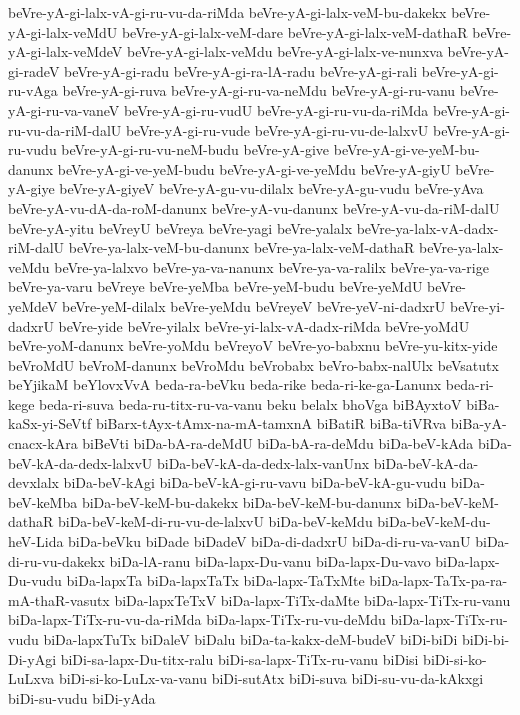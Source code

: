 {beVre-yA-gi-lalx-vA-gi-ru-vu-da-riMda
beVre-yA-gi-lalx-veM-bu-dakekx
beVre-yA-gi-lalx-veMdU
beVre-yA-gi-lalx-veM-dare
beVre-yA-gi-lalx-veM-dathaR
beVre-yA-gi-lalx-veMdeV
beVre-yA-gi-lalx-veMdu
beVre-yA-gi-lalx-ve-nunxva
beVre-yA-gi-radeV
beVre-yA-gi-radu
beVre-yA-gi-ra-lA-radu
beVre-yA-gi-rali
beVre-yA-gi-ru-vAga
beVre-yA-gi-ruva
beVre-yA-gi-ru-va-neMdu
beVre-yA-gi-ru-vanu
beVre-yA-gi-ru-va-vaneV
beVre-yA-gi-ru-vudU
beVre-yA-gi-ru-vu-da-riMda
beVre-yA-gi-ru-vu-da-riM-dalU
beVre-yA-gi-ru-vude
beVre-yA-gi-ru-vu-de-lalxvU
beVre-yA-gi-ru-vudu
beVre-yA-gi-ru-vu-neM-budu
beVre-yA-give
beVre-yA-gi-ve-yeM-bu-danunx
beVre-yA-gi-ve-yeM-budu
beVre-yA-gi-ve-yeMdu
beVre-yA-giyU
beVre-yA-giye
beVre-yA-giyeV
beVre-yA-gu-vu-dilalx
beVre-yA-gu-vudu
beVre-yAva
beVre-yA-vu-dA-da-roM-danunx
beVre-yA-vu-danunx
beVre-yA-vu-da-riM-dalU
beVre-yA-yitu
beVreyU
beVreya
beVre-yagi
beVre-yalalx
beVre-ya-lalx-vA-dadx-riM-dalU
beVre-ya-lalx-veM-bu-danunx
beVre-ya-lalx-veM-dathaR
beVre-ya-lalx-veMdu
beVre-ya-lalxvo
beVre-ya-va-nanunx
beVre-ya-va-ralilx
beVre-ya-va-rige
beVre-ya-varu
beVreye
beVre-yeMba
beVre-yeM-budu
beVre-yeMdU
beVre-yeMdeV
beVre-yeM-dilalx
beVre-yeMdu
beVreyeV
beVre-yeV-ni-dadxrU
beVre-yi-dadxrU
beVre-yide
beVre-yilalx
beVre-yi-lalx-vA-dadx-riMda
beVre-yoMdU
beVre-yoM-danunx
beVre-yoMdu
beVreyoV
beVre-yo-babxnu
beVre-yu-kitx-yide
beVroMdU
beVroM-danunx
beVroMdu
beVrobabx
beVro-babx-nalUlx
beVsatutx
beYjikaM
beYlovxVvA
beda-ra-beVku
beda-rike
beda-ri-ke-ga-Lanunx
beda-ri-kege
beda-ri-suva
beda-ru-titx-ru-va-vanu
beku
belalx
bhoVga
biBAyxtoV
biBa-kaSx-yi-SeVtf
biBarx-tAyx-tAmx-na-mA-tamxnA
biBatiR
biBa-tiVRva
biBa-yA-cnacx-kAra
biBeVti
biDa-bA-ra-deMdU
biDa-bA-ra-deMdu
biDa-beV-kAda
biDa-beV-kA-da-dedx-lalxvU
biDa-beV-kA-da-dedx-lalx-vanUnx
biDa-beV-kA-da-devxlalx
biDa-beV-kAgi
biDa-beV-kA-gi-ru-vavu
biDa-beV-kA-gu-vudu
biDa-beV-keMba
biDa-beV-keM-bu-dakekx
biDa-beV-keM-bu-danunx
biDa-beV-keM-dathaR
biDa-beV-keM-di-ru-vu-de-lalxvU
biDa-beV-keMdu
biDa-beV-keM-du-heV-Lida
biDa-beVku
biDade
biDadeV
biDa-di-dadxrU
biDa-di-ru-va-vanU
biDa-di-ru-vu-dakekx
biDa-lA-ranu
biDa-lapx-Du-vanu
biDa-lapx-Du-vavo
biDa-lapx-Du-vudu
biDa-lapxTa
biDa-lapxTaTx
biDa-lapx-TaTxMte
biDa-lapx-TaTx-pa-ra-mA-thaR-vasutx
biDa-lapxTeTxV
biDa-lapx-TiTx-daMte
biDa-lapx-TiTx-ru-vanu
biDa-lapx-TiTx-ru-vu-da-riMda
biDa-lapx-TiTx-ru-vu-deMdu
biDa-lapx-TiTx-ru-vudu
biDa-lapxTuTx
biDaleV
biDalu
biDa-ta-kakx-deM-budeV
biDi-biDi
biDi-bi-Di-yAgi
biDi-sa-lapx-Du-titx-ralu
biDi-sa-lapx-TiTx-ru-vanu
biDisi
biDi-si-ko-LuLxva
biDi-si-ko-LuLx-va-vanu
biDi-sutAtx
biDi-suva
biDi-su-vu-da-kAkxgi
biDi-su-vudu
biDi-yAda
}

